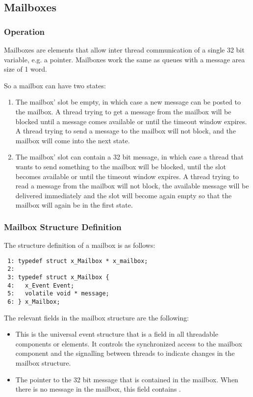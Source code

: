 %
%

\subsection{Mailboxes}

\subsubsection{Operation}

Mailboxes are elements that allow inter thread communication of a single 32
bit variable, e.g. a pointer. Mailboxes work the same as queues with a
message area size of 1 word.

So a mailbox can have two states:

\begin{enumerate}
\item The mailbox' slot be empty, in which case a new message can be posted
to the mailbox. A thread trying to get a message from the mailbox will be
blocked until a message comes available or until the timeout window expires.
A thread trying to send a message to the mailbox will not block, and the
mailbox will come into the next state.
\item The mailbox' slot can contain a 32 bit message, in which case a thread
that wants to send something to the mailbox will be blocked, until the slot
becomes available or until the timeout window expires. A thread trying to
read a message from the mailbox will not block, the available message will
be delivered immediately and the slot will become again empty so that the
mailbox will again be in the first state.
\end{enumerate}

\subsubsection{Mailbox Structure Definition}

The structure definition of a mailbox is as follows:

\bcode
\begin{verbatim}
 1: typedef struct x_Mailbox * x_mailbox;
 2:
 3: typedef struct x_Mailbox {
 4:   x_Event Event;
 5:   volatile void * message;
 6: } x_Mailbox;
\end{verbatim}
\ecode

The relevant fields in the mailbox structure are the following:

\begin{itemize}
\item {} This is the universal event structure that is a field
in all threadable components or elements. It controls the synchronized access
to the mailbox component and the signalling between threads to indicate changes
in the mailbox structure.
\item {} The pointer to the 32 bit
message that is contained in the mailbox. When there is no message in the
mailbox, this field contains .
\end{itemize}


